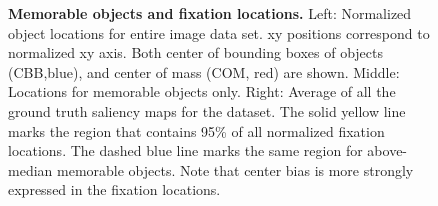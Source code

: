 
\begin{figure}[t]
\centering
{}
\vspace{-5mm}\caption{\footnotesize\textbf{Memorable objects and fixation locations.} Left: Normalized object locations for entire image data set. xy positions correspond to normalized xy axis. Both center of bounding boxes of objects (CBB,blue), and center of mass (COM, red) are shown. Middle: Locations for memorable objects only. Right: Average of all the ground truth saliency maps for the dataset. The solid yellow line marks the region that contains 95\% of all normalized fixation locations. The dashed blue line marks the same region for above-median memorable objects. Note that center bias is more strongly expressed in the fixation locations.}\label{fig:fixPos}
\end{figure}




